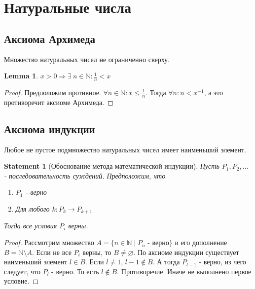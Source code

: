 \documentclass[11pt]{book}
\newcommand{\N}{\mathbb{N}}
\renewcommand{\le}{\leqslant}
\theoremstyle{definition}
\theoremstyle{plain}
\theoremstyle{plain}
\newtheorem*{lm}{Lemma}
\newtheorem*{st}{Statement}
\theoremstyle{definition}
\theoremstyle{remark}
\begin{document}
\section{Натуральные числа}
\subsection{Аксиома Архимеда}\label{ques_1}
\begin{aks}[Архимед]
    Множество натуральных чисел не ограниченно сверху.
\end{aks}
\begin{lm}
    $x > 0 \Rightarrow \exists~n \in \N: \frac{1}{n} < x$
\end{lm}
\begin{proof}
    Предположим противное. $\forall n \in \N: x \le \frac{1}{n}$. Тогда $\forall n: n < x^{-1}$, а это противоречит аксиоме Архимеда.
\end{proof}

\subsection{Аксиома индукции}\label{ques_2}
\begin{aks}[индукции]
    Любое не пустое подмножество натуральных чисел имеет наименьший элемент.
\end{aks}
\begin{st}[Обоснование метода математической индукции]
    Пусть $P_1, P_2, \ldots $ - последовательность суждений.
    Предположим, что 
    \begin{enumerate}
        \item $P_1$  - верно
	\item Для любого $k : P_k \to P_{k+1}$
    \end{enumerate}
    Тогда все условия $P_i$ верны.
\end{st}
\begin{proof}
    Рассмотрим множество $A= \{n \in \N \mid P_n \mbox{ - верно}\} $ и его дополнение $B = \N \setminus A$. Если не все $P_i$ верны, то $B \ne \varnothing$. По аксиоме индукции существует наименьший элемент  $l \in B$. Если $l \ne 1$, $l-1 \notin B $. А тогда $P_{l-1}$ - верно, из чего следует, что $P_l $ - верно. То есть $l \notin B$. Противоречие. Иначе не выполнено первое условие.
\end{proof}
\end{document}
